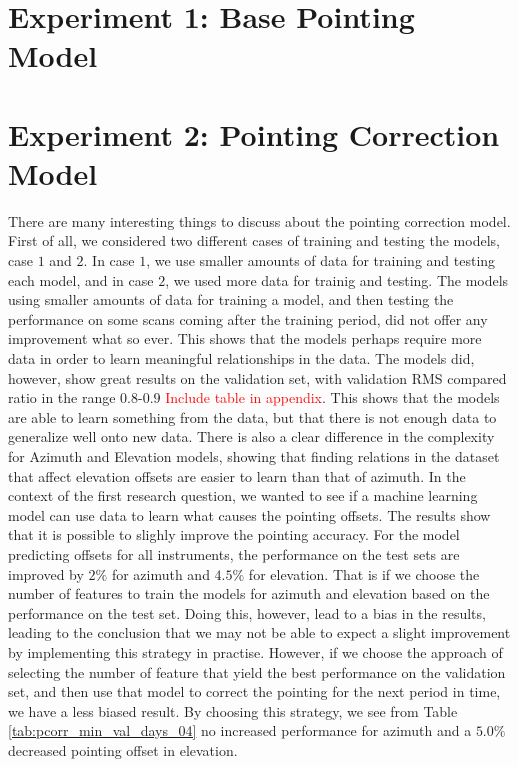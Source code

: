 \section{Experiment 1: Base Pointing Model}
 

\section{Experiment 2: Pointing Correction Model}
There are many interesting things to discuss about the pointing correction model.
First of all, we considered two different cases of training and testing the models, case $1$ and $2$.
In case $1$, we use smaller amounts of data for training and testing each model, and in case $2$, we used more data for trainig and testing.
The models using smaller amounts of data for training a model, and then testing the performance on some scans coming after the training period, 
did not offer any improvement what so ever. This shows that the models perhaps require more data in order to learn meaningful relationships in the data.
The models did, however, show great results on the validation set, with validation RMS compared ratio in the range $0.8$-$0.9$ \textcolor{red}{Include table in appendix}.
This shows that the models are able to learn something from the data, but that there is not enough data to generalize well onto new data.
There is also a clear difference in the complexity for Azimuth and Elevation models, showing that finding relations in the dataset
that affect elevation offsets are easier to learn than that of azimuth. 
In the context of the first research question, we wanted to see if a machine learning model can use data to learn what causes the pointing offsets.
The results show that it is possible to slighly improve the pointing accuracy. 
For the model predicting offsets for all instruments, the performance on the test sets are improved by $2\%$ for azimuth and $4.5\%$ for elevation.
That is if we choose the number of features to train the models for azimuth and elevation based on the performance on the test set.
Doing this, however, lead to a bias in the results, leading to the conclusion that we may not be able to expect a slight improvement by implementing this strategy in practise.
However, if we choose the approach of selecting the number of feature that yield the best performance on the validation set, and then use that model to correct the pointing for the next period in time,
we have a less biased result. 
By choosing this strategy, we see from Table \ref{tab:pcorr_min_val_days_04} no increased performance for azimuth and a $5.0\%$ decreased pointing offset in elevation.

